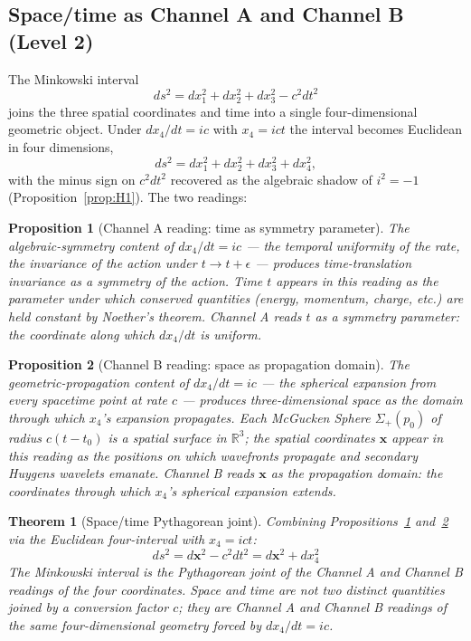 \documentclass[11pt,a4paper]{article}
\newtheorem{theorem}{Theorem}
\newtheorem{proposition}{Proposition}
\begin{document}
\subsection{Space/time as Channel A and Channel B (Level 2)}

The Minkowski interval
\begin{equation}
ds^2 = dx_1^2 + dx_2^2 + dx_3^2 - c^2 dt^2
\end{equation}
joins the three spatial coordinates and time into a single four-dimensional geometric object. Under $dx_4/dt = ic$ with $x_4 = ict$ the interval becomes Euclidean in four dimensions,
\begin{equation}
ds^2 = dx_1^2 + dx_2^2 + dx_3^2 + dx_4^2,
\end{equation}
with the minus sign on $c^2 dt^2$ recovered as the algebraic shadow of $i^2 = -1$ (Proposition~\ref{prop:H1}). The two readings:

\begin{proposition}[Channel A reading: time as symmetry parameter]
\label{prop:timeA}
The algebraic-symmetry content of $dx_4/dt = ic$ --- the temporal uniformity of the rate, the invariance of the action under $t \to t + \epsilon$ --- produces time-translation invariance as a symmetry of the action. Time $t$ appears in this reading as the parameter under which conserved quantities (energy, momentum, charge, etc.) are held constant by Noether's theorem. Channel A reads $t$ as a symmetry parameter: the coordinate along which $dx_4/dt$ is uniform.
\end{proposition}

\begin{proposition}[Channel B reading: space as propagation domain]
\label{prop:spaceB}
The geometric-propagation content of $dx_4/dt = ic$ --- the spherical expansion from every spacetime point at rate $c$ --- produces three-dimensional space as the domain through which $x_4$'s expansion propagates. Each McGucken Sphere $\Sigma_+(p_0)$ of radius $c(t - t_0)$ is a spatial surface in $\mathbb{R}^3$; the spatial coordinates $\mathbf{x}$ appear in this reading as the positions on which wavefronts propagate and secondary Huygens wavelets emanate. Channel B reads $\mathbf{x}$ as the propagation domain: the coordinates through which $x_4$'s spherical expansion extends.
\end{proposition}

\begin{theorem}[Space/time Pythagorean joint]
\label{thm:spacetime}
Combining Propositions~\ref{prop:timeA} and~\ref{prop:spaceB} via the Euclidean four-interval with $x_4 = ict$:
\begin{equation}
\boxed{ds^2 = d\mathbf{x}^2 - c^2 dt^2 = d\mathbf{x}^2 + dx_4^2}
\label{eq:spacetime}
\end{equation}
The Minkowski interval is the Pythagorean joint of the Channel A and Channel B readings of the four coordinates. Space and time are not two distinct quantities joined by a conversion factor $c$; they are Channel A and Channel B readings of the same four-dimensional geometry forced by $dx_4/dt = ic$.
\end{theorem}
\end{document}
